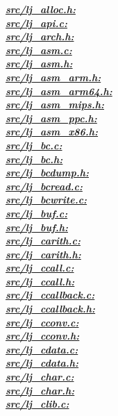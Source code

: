 \underline{\textbf{\emph{src/lj\_alloc.h:}}}\\
\underline{\textbf{\emph{src/lj\_api.c:}}}\\
\underline{\textbf{\emph{src/lj\_arch.h:}}}\\
\underline{\textbf{\emph{src/lj\_asm.c:}}}\\
\underline{\textbf{\emph{src/lj\_asm.h:}}}\\
\underline{\textbf{\emph{src/lj\_asm\_arm.h:}}}\\
\underline{\textbf{\emph{src/lj\_asm\_arm64.h:}}}\\
\underline{\textbf{\emph{src/lj\_asm\_mips.h:}}}\\
\underline{\textbf{\emph{src/lj\_asm\_ppc.h:}}}\\
\underline{\textbf{\emph{src/lj\_asm\_x86.h:}}}\\
\underline{\textbf{\emph{src/lj\_bc.c:}}}\\
\underline{\textbf{\emph{src/lj\_bc.h:}}}\\
\underline{\textbf{\emph{src/lj\_bcdump.h:}}}\\
\underline{\textbf{\emph{src/lj\_bcread.c:}}}\\
\underline{\textbf{\emph{src/lj\_bcwrite.c:}}}\\
\underline{\textbf{\emph{src/lj\_buf.c:}}}\\
\underline{\textbf{\emph{src/lj\_buf.h:}}}\\
\underline{\textbf{\emph{src/lj\_carith.c:}}}\\
\underline{\textbf{\emph{src/lj\_carith.h:}}}\\
\underline{\textbf{\emph{src/lj\_ccall.c:}}}\\
\underline{\textbf{\emph{src/lj\_ccall.h:}}}\\
\underline{\textbf{\emph{src/lj\_ccallback.c:}}}\\
\underline{\textbf{\emph{src/lj\_ccallback.h:}}}\\
\underline{\textbf{\emph{src/lj\_cconv.c:}}}\\
\underline{\textbf{\emph{src/lj\_cconv.h:}}}\\
\underline{\textbf{\emph{src/lj\_cdata.c:}}}\\
\underline{\textbf{\emph{src/lj\_cdata.h:}}}\\
\underline{\textbf{\emph{src/lj\_char.c:}}}\\
\underline{\textbf{\emph{src/lj\_char.h:}}}\\
\underline{\textbf{\emph{src/lj\_clib.c:}}}\\
